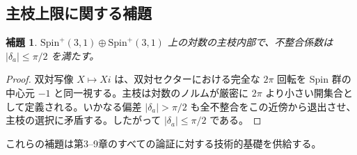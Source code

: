 \documentclass[a4paper]{article}
\newtheorem{lemma}[theorem]{補題}
\theoremstyle{definition}
\theoremstyle{remark}
\begin{document}
\subsection{主枝上限に関する補題}

\begin{lemma}
\(\mathrm{Spin}^+(3,1) \oplus \mathrm{Spin}^+(3,1)\) 上の対数の主枝内部で、不整合係数は \( |\delta_a| \leq \pi/2 \) を満たす。
\end{lemma}

\begin{proof}
双対写像 \( X \mapsto Xi \) は、双対セクターにおける完全な \( 2\pi \) 回転を Spin 群の中心元 \( -1 \) と同一視する。主枝は対数のノルムが厳密に \( 2\pi \) より小さい開集合として定義される。いかなる偏差 \( |\delta_a| > \pi/2 \) も全不整合をこの近傍から退出させ、主枝の選択に矛盾する。したがって \( |\delta_a| \leq \pi/2 \) である。
\end{proof}

これらの補題は第3--9章のすべての論証に対する技術的基礎を供給する。
\end{document}
